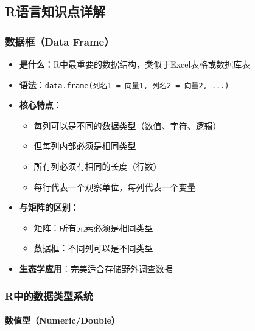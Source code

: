 \documentclass[
  twoside]{book}
\providecommand{\tightlist}{%
  \setlength{\itemsep}{0pt}\setlength{\parskip}{0pt}}
\begin{document}
\hypertarget{rux8bedux8a00ux77e5ux8bc6ux70b9ux8be6ux89e3-2}{%
\subsection{R语言知识点详解}\label{rux8bedux8a00ux77e5ux8bc6ux70b9ux8be6ux89e3-2}}

\hypertarget{ux6570ux636eux6846data-frame}{%
\subsubsection{数据框（Data Frame）}\label{ux6570ux636eux6846data-frame}}

\begin{itemize}
\tightlist
\item
  \textbf{是什么}：R中最重要的数据结构，类似于Excel表格或数据库表
\item
  \textbf{语法}：\texttt{data.frame(列名1\ =\ 向量1,\ 列名2\ =\ 向量2,\ ...)}
\item
  \textbf{核心特点}：

  \begin{itemize}
  \tightlist
  \item
    每列可以是不同的数据类型（数值、字符、逻辑）
  \item
    但每列内部必须是相同类型
  \item
    所有列必须有相同的长度（行数）
  \item
    每行代表一个观察单位，每列代表一个变量
  \end{itemize}
\item
  \textbf{与矩阵的区别}：

  \begin{itemize}
  \tightlist
  \item
    矩阵：所有元素必须是相同类型
  \item
    数据框：不同列可以是不同类型
  \end{itemize}
\item
  \textbf{生态学应用}：完美适合存储野外调查数据
\end{itemize}

\hypertarget{rux4e2dux7684ux6570ux636eux7c7bux578bux7cfbux7edf}{%
\subsubsection{R中的数据类型系统}\label{rux4e2dux7684ux6570ux636eux7c7bux578bux7cfbux7edf}}

\hypertarget{ux6570ux503cux578bnumericdouble}{%
\paragraph{数值型（Numeric/Double）}\label{ux6570ux503cux578bnumericdouble}}
\end{document}
